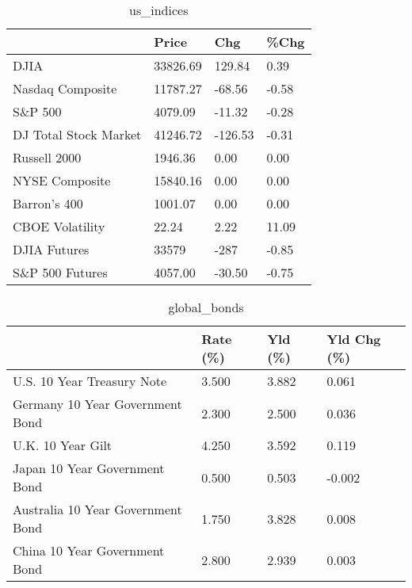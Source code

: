 \documentclass{article}%
\begin{document}
%


\begin{table}[htbp]%
\caption{us\_indices}%
\centering%
\begin{adjustbox}{width=1\textwidth}%
\begin{tabular}{llll}
\toprule
                      &    Price &     Chg &  \%Chg \\
\midrule
                 DJIA & 33826.69 &  129.84 &  0.39 \\
     Nasdaq Composite & 11787.27 &  -68.56 & -0.58 \\
              S\&P 500 &  4079.09 &  -11.32 & -0.28 \\
DJ Total Stock Market & 41246.72 & -126.53 & -0.31 \\
         Russell 2000 &  1946.36 &    0.00 &  0.00 \\
       NYSE Composite & 15840.16 &    0.00 &  0.00 \\
         Barron's 400 &  1001.07 &    0.00 &  0.00 \\
      CBOE Volatility &    22.24 &    2.22 & 11.09 \\
         DJIA Futures &    33579 &    -287 & -0.85 \\
      S\&P 500 Futures &  4057.00 &  -30.50 & -0.75 \\
\bottomrule
\end{tabular}
%
\end{adjustbox}%
\end{table}

%


\begin{table}[htbp]%
\caption{global\_bonds}%
\centering%
\begin{adjustbox}{width=1\textwidth}%
\begin{tabular}{llll}
\toprule
                                  & Rate (\%) & Yld (\%) & Yld Chg (\%) \\
\midrule
       U.S. 10 Year Treasury Note &    3.500 &   3.882 &       0.061 \\
  Germany 10 Year Government Bond &    2.300 &   2.500 &       0.036 \\
                U.K. 10 Year Gilt &    4.250 &   3.592 &       0.119 \\
    Japan 10 Year Government Bond &    0.500 &   0.503 &      -0.002 \\
Australia 10 Year Government Bond &    1.750 &   3.828 &       0.008 \\
    China 10 Year Government Bond &    2.800 &   2.939 &       0.003 \\
\bottomrule
\end{tabular}
%
\end{adjustbox}%
\end{table}
\end{document}
